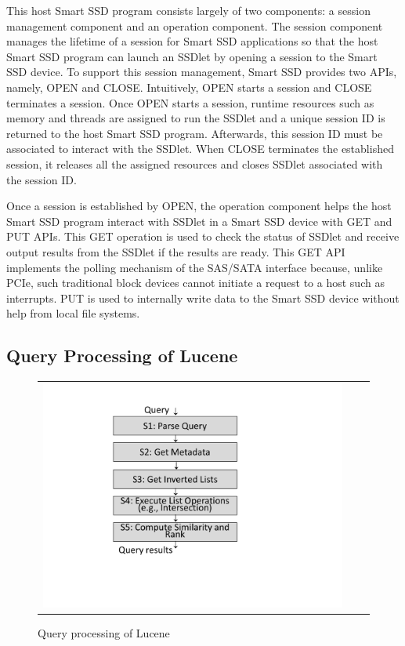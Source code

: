 This host Smart SSD program consists largely of two components: a session management component and an operation component. The session component manages the lifetime of a session for Smart SSD applications so that the host Smart SSD program can launch an SSDlet by opening a session to the Smart SSD device. To support this session management, Smart SSD provides two APIs, namely, OPEN and CLOSE. Intuitively, OPEN starts a session and CLOSE terminates a session. Once OPEN starts a session, runtime resources such as memory and threads are assigned to run the SSDlet and a unique session ID is returned to the host Smart SSD program. Afterwards, this session ID must be associated to interact with the SSDlet. When CLOSE terminates the established session, it releases all the assigned resources and closes SSDlet associated with the session ID.

Once a session is established by OPEN, the operation component helps the host Smart SSD program interact with SSDlet in a Smart SSD device with GET and PUT APIs. This GET operation is used to check the status of SSDlet and receive output results from the SSDlet if the results are ready. This GET API implements the polling mechanism of the SAS/SATA interface because, unlike PCIe, such traditional block devices cannot initiate a request to a host such as interrupts. PUT is used to internally write data to the Smart SSD device without help from local file systems.


\subsection{Query Processing of Lucene}\label{sec:searchEngineArch}

\begin{figure}[htbp]
  \centering
  \begin{tabular}{ccc}
 \includegraphics[width=0.4\columnwidth]{figures/searchEngineArch.pdf}
\end{tabular}
  \caption{Query processing of Lucene}
  \label{fig:searchEngineArch}
 \end{figure}

